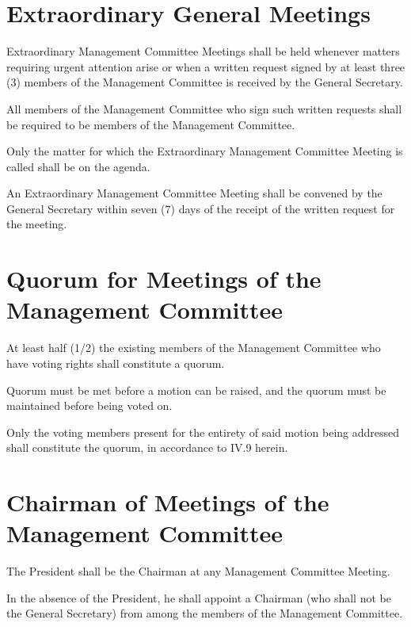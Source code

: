 \section{Extraordinary General Meetings}
Extraordinary Management Committee Meetings shall be held whenever matters requiring urgent attention arise or when a written request signed by at least three (3) members of the Management Committee is received by the General Secretary.
	\begin{legal}
	\item All members of the Management Committee who sign such written requests shall be required to be members of the Management Committee.
	\item Only the matter for which the Extraordinary Management Committee Meeting is called shall be on the agenda.
	\item An Extraordinary Management Committee Meeting shall be convened by the General Secretary within seven (7) days of the receipt of the written request for the meeting.
	\end{legal}

\section{Quorum for Meetings of the Management Committee}
At least half (1/2) the existing members of the Management Committee who have voting rights shall constitute a quorum.
	\begin{legal}
	\item Quorum must be met before a motion can be raised, and the quorum must be maintained before being voted on.
	\item Only the voting members present for the entirety of said motion being addressed shall constitute the quorum, in accordance to IV.9 herein.
	\end{legal}

\section{Chairman of Meetings of the Management Committee}
The President shall be the Chairman at any Management Committee Meeting.
	\begin{legal}
	\item In the absence of the President, he shall appoint a Chairman (who shall not be the General Secretary) from among the members of the Management Committee.
	\end{legal}

